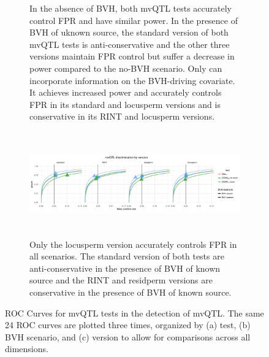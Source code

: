 \begin{figure}[ht]
\begin{subfigure}{\textwidth}
          \caption{
          In the absence of BVH, both mvQTL tests accurately control FPR and have similar power.
          In the presence of BVH of uknown source, the standard version of both mvQTL tests is anti-conservative and the other three versions maintain FPR control but suffer a decrease in power compared to the no-BVH scenario.
          Only \DGLMmv can incorporate information on the BVH-driving covariate.
          It achieves increased power and accurately controls FPR in its standard and locusperm versions and is conservative in its RINT and locusperm versions.
          }
      \vspace*{0.5cm}
      \end{subfigure}
      \begin{subfigure}{\textwidth}
          \centering
          \includegraphics[height = 4.5cm]{images/rocs_mvqtl_all_facet_by_eval.pdf}
          \caption{
          Only the locusperm version accurately controls FPR in all scenarios.
          The standard version of both tests are anti-conservative in the presence of BVH of known source and the RINT and residperm versions are conservative in \DGLMmv the presence of BVH of known source.
          }
      \end{subfigure}
      \caption[
        ROC Curves for mvQTL tests in the detection of mvQTL.
      ]
      {
        ROC Curves for mvQTL tests in the detection of mvQTL.
        The same 24 ROC curves are plotted three times, organized by (a) test, (b) BVH scenario, and (c) version to allow for comparisons across all dimensions.
      }
      \label{fig:mvqtl_rocs_supp}
  \end{figure}

\FloatBarrier
\clearpage
